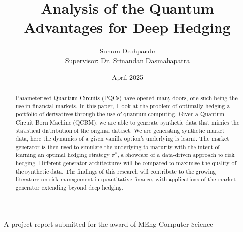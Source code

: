 \documentclass[12pt]{article}
\title{Analysis of the Quantum Advantages for Deep Hedging}
\author{Soham Deshpande\\ Supervisor: Dr. Srinandan Dasmahapatra}
\date{April 2025}
\newcommand{\detailtexcount}[1]{%
  \immediate\write18{texcount -merge #1.tex > #1.wcdetail }%
}
\numberwithin{equation}{section}
\begin{document}
\maketitle
\vspace{10cm}
A project report submitted for the award of MEng Computer Science
\thispagestyle{empty}







\clearpage


\begin{abstract}
Parameterised Quantum Circuits (PQCs) have opened many doors, one 
such being the use in financial markets. In this paper, I look at the problem 
of optimally hedging a portfolio of derivatives through the use of quantum computing. 
Given a Quantum Circuit Born Machine (QCBM), we are able to generate synthetic 
data that mimics the statistical distribution of the original dataset. 
We are generating synthetic market data, here the dynamics of a 
given vanilla option's underlying is learnt. The market generator is then used to simulate the 
underlying to maturity with the intent of learning an optimal hedging strategy $\pi^*$, a 
showcase of a data-driven approach to risk hedging. Different generator architectures
will be compared to maximise the quality of the synthetic data. The findings of 
this research will contribute to the growing literature on risk management in 
quantitative finance, with applications of the market generator extending beyond 
deep hedging. 
\end{abstract}

\clearpage


\tableofcontents
\clearpage



\end{document}
